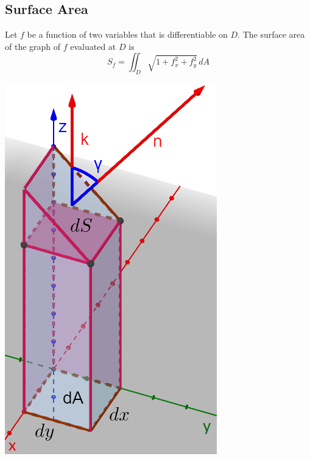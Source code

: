 \documentclass[12pt]{article}
\begin{document}
\subsection{Surface Area}
Let $f$ be a function of two variables that is differentiable on $D$. The surface area of the graph of $f$ evaluated at $D$ is $$ S_f = \iint_D \sqrt{1+f^2_x+f^2_y} \,dA$$

\includegraphics[scale=0.46]{surf.png}
\end{document}
